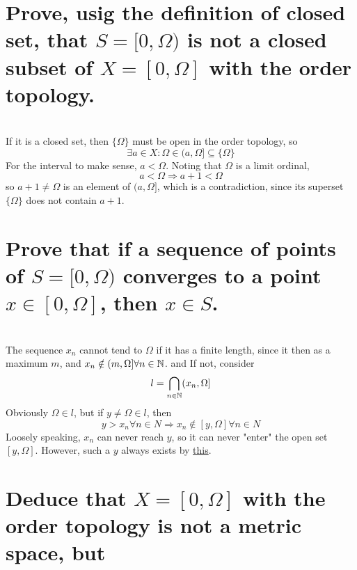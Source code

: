 
\begin{parts}
 
 \part{Prove, usig the definition of closed set, that $S = [0, \Omega)$ is not a closed subset of $X = [0, \Omega]$ with the order topology.}
 
\begin{solution}
 \\If it is a closed set, then $\{\Omega\}$ must be open in the order topology, so
 $$\exists a \in X: \Omega \in (a,\Omega] \subseteq \{\Omega\}$$
For the interval to make sense, $a < \Omega$. Noting that $\Omega$ is a limit ordinal,
$$a < \Omega \Rightarrow a+1 < \Omega$$
so $a+1 \neq \Omega$ is an element of $(a, \Omega]$, which is a contradiction, since its superset $\{\Omega\}$ does not contain $a+1$.
 \end{solution}
 
 \part{Prove that if a sequence of points of $S = [0, \Omega)$ converges to a point $x \in [0, \Omega]$, then $x \in S$.}
 
\begin{solution}
\\The sequence $x_n$ cannot tend to $\Omega$ if it has a finite length, since it then as a maximum $m$, and $x_n \notin (m, \Omega] \forall n \in \mathbb{N}$. and If not, consider
 $$l = \bigcap_{n \in \mathbb{N}} (x_n, \Omega]$$
 Obviously $\Omega \in l$, but if $y \neq \Omega \in l$, then
 $$y > x_n \forall n \in N \Rightarrow x_n \notin [y, \Omega] \forall n \in N$$
 Loosely speaking, $x_n$ can never reach $y$, so it can never "enter" the open set $[y, \Omega]$. However, such a $y$ always exists by \hyperref[supp]{this}.
\end{solution}

\part{Deduce that $X = [0, \Omega]$ with the order topology is not a metric space, but}


\end{parts}
